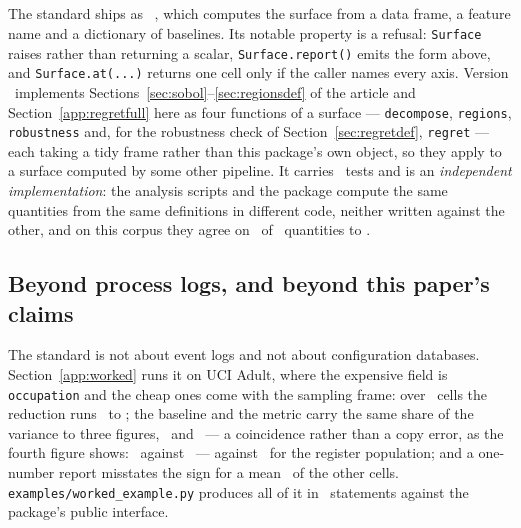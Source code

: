\subsection{\Pkgname}
\label{sec:tool}

The standard ships as \pkgname\ \citep{fieldvalue}, which computes the surface from a
data frame, a feature name and a dictionary of baselines. Its notable
property is a refusal: \texttt{Surface} raises rather than returning a
scalar, \texttt{Surface.report()} emits the form above, and
\texttt{Surface.at(...)} returns one cell only if the caller names every
axis. Version \fvVersion\ implements
Sections~\ref{sec:sobol}--\ref{sec:regionsdef} of the article and
Section~\ref{app:regretfull} here as four functions of a surface
--- \texttt{decompose}, \texttt{regions}, \texttt{robustness} and, for the
robustness check of Section~\ref{sec:regretdef}, \texttt{regret} --- each
taking a tidy frame rather than this package's own object, so they
apply to a surface computed by some other pipeline. It carries \nTests\ tests
and is an \emph{independent implementation}: the analysis scripts and the
package compute the same quantities from the same definitions in different
code, neither written against the other, and on this corpus they agree on
\nAgreeQuantities\ of \nAgreeQuantities\ quantities to \agreeTolerance.

\subsection{Beyond process logs, and beyond this paper's claims}
\label{sec:worked}

The standard is not about event logs and not about configuration databases.
Section~\ref{app:worked} runs it on UCI Adult, where the expensive field is
\texttt{occupation} and the cheap ones come with the sampling frame: over
\exCells\ cells the reduction runs \exRmin\ to \exRmax; the baseline and the
metric carry the same share of the variance to three figures,
\exSbaselinePct\ and \exSmetricPct\ --- a coincidence rather than a copy
error, as the fourth figure shows: \exSbaselineFine\ against \exSmetricFine\
--- against \exSpopulationPct\ for the
register population; and a one-number report misstates the sign for a mean
\exMisreportPct\ of the other cells. \texttt{examples/worked\_example.py}
produces all of it in \exampleLines\ statements against the package's public
interface.

